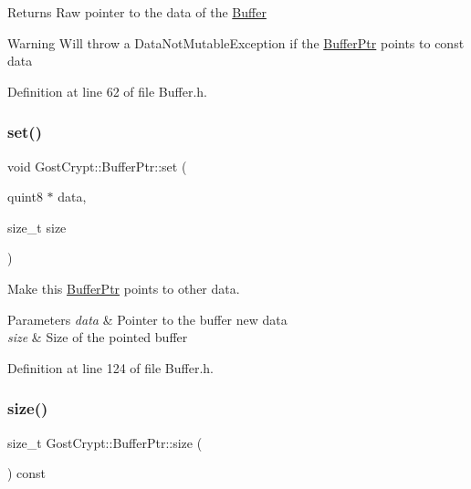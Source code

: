 \begin{DoxyReturn}{Returns}
Raw pointer to the data of the \hyperlink{class_gost_crypt_1_1_buffer}{Buffer} 
\end{DoxyReturn}
\begin{DoxyWarning}{Warning}
Will throw a Data\+Not\+Mutable\+Exception if the \hyperlink{class_gost_crypt_1_1_buffer_ptr}{Buffer\+Ptr} points to const data 
\end{DoxyWarning}


Definition at line 62 of file Buffer.\+h.

\mbox{\label{class_gost_crypt_1_1_buffer_ptr_adacd6631bd8d66305d0f636e29f9c92f}} 
\subsubsection{\texorpdfstring{set()}{set()}}
{\footnotesize\ttfamily void Gost\+Crypt\+::\+Buffer\+Ptr\+::set (\begin{DoxyParamCaption}\item[{quint8 $\ast$}]{data,  }\item[{size\+\_\+t}]{size }\end{DoxyParamCaption})\hspace{0.3cm}{\ttfamily [inline]}}



Make this \hyperlink{class_gost_crypt_1_1_buffer_ptr}{Buffer\+Ptr} points to other data. 


\begin{DoxyParams}{Parameters}
{\em data} & Pointer to the buffer new data \\
\hline
{\em size} & Size of the pointed buffer \\
\hline
\end{DoxyParams}


Definition at line 124 of file Buffer.\+h.

\mbox{\label{class_gost_crypt_1_1_buffer_ptr_a1fd092a6706a9ad67a601280ea1377d5}} 
\subsubsection{\texorpdfstring{size()}{size()}}
{\footnotesize\ttfamily size\+\_\+t Gost\+Crypt\+::\+Buffer\+Ptr\+::size (\begin{DoxyParamCaption}{ }\end{DoxyParamCaption}) const\hspace{0.3cm}{\ttfamily [inline]}}



